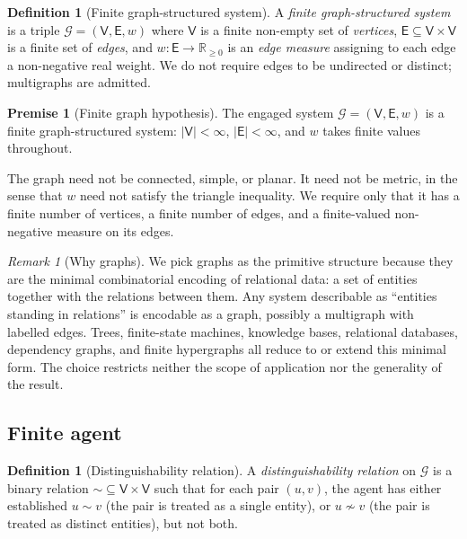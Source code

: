 \documentclass[11pt,a4paper]{article}
\theoremstyle{thmstyle}
\theoremstyle{definition}
\newtheorem{definition}[theorem]{Definition}
\newtheorem{axiom}{Premise}
\theoremstyle{remark}
\newtheorem{remark}[theorem]{Remark}
\newcommand{\R}{\mathbb{R}}
\newcommand{\Graph}{\mathcal{G}}
\newcommand{\Vrt}{\mathsf{V}}
\newcommand{\Edg}{\mathsf{E}}
\begin{document}
\begin{definition}[Finite graph-structured system]
\label{def:graph}
A \emph{finite graph-structured system} is a triple $\Graph =
(\Vrt, \Edg, w)$ where $\Vrt$ is a finite non-empty set of
\emph{vertices}, $\Edg \subseteq \Vrt \times \Vrt$ is a finite set
of \emph{edges}, and $w: \Edg \to \R_{\geq 0}$ is an \emph{edge
measure} assigning to each edge a non-negative real weight. We do
not require edges to be undirected or distinct; multigraphs are
admitted.
\end{definition}

\begin{axiom}[Finite graph hypothesis]
\label{ax:graph}
The engaged system $\Graph = (\Vrt, \Edg, w)$ is a finite
graph-structured system: $|\Vrt| < \infty$, $|\Edg| < \infty$, and
$w$ takes finite values throughout.
\end{axiom}

The graph need not be connected, simple, or planar. It need not be
metric, in the sense that $w$ need not satisfy the triangle
inequality. We require only that it has a finite number of
vertices, a finite number of edges, and a finite-valued non-negative
measure on its edges.

\begin{remark}[Why graphs]
\label{rem:why_graphs}
We pick graphs as the primitive structure because they are the
minimal combinatorial encoding of relational data: a set of entities
together with the relations between them. Any system describable as
``entities standing in relations'' is encodable as a graph, possibly
a multigraph with labelled edges. Trees, finite-state machines,
knowledge bases, relational databases, dependency graphs, and finite
hypergraphs all reduce to or extend this minimal form. The choice
restricts neither the scope of application nor the generality of the
result.
\end{remark}

\subsection{Finite agent}

\begin{definition}[Distinguishability relation]
\label{def:distrel}
A \emph{distinguishability relation} on $\Graph$ is a binary
relation $\sim \subseteq \Vrt \times \Vrt$ such that for each pair
$(u, v)$, the agent has either established $u \sim v$ (the pair is
treated as a single entity), or $u \not\sim v$ (the pair is treated
as distinct entities), but not both.
\end{definition}
\end{document}
